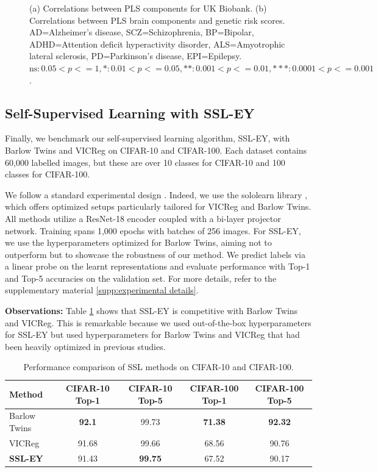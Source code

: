 \begin{figure}
\begin{subfigure}[b]{0.72\textwidth}
          \caption{}
          \label{fig:genetic_risk}
     \end{subfigure}
\caption{(a) Correlations between PLS components for UK Biobank. (b) Correlations between PLS brain components and genetic risk scores. AD=Alzheimer's disease, SCZ=Schizophrenia, BP=Bipolar, ADHD=Attention deficit hyperactivity disorder, ALS=Amyotrophic lateral sclerosis, PD=Parkinson's disease, EPI=Epilepsy. $\text{ns}: 0.05< p <= 1, \ast: 0.01< p <=0.05, \ast\ast: 0.001< p <= 0.01, \ast\ast\ast: 0.0001< p <= 0.001$.}
\end{figure}

\subsection{Self-Supervised Learning with SSL-EY}
Finally, we benchmark our self-supervised learning algorithm, SSL-EY, with Barlow Twins and VICReg on CIFAR-10 and CIFAR-100. Each dataset contains 60,000 labelled images, but these are over 10 classes for CIFAR-10 and 100 classes for CIFAR-100.

We follow a standard experimental design \citep{tong2023emp}. Indeed, we use the sololearn library \citep{da2022solo}, which offers optimized setups particularly tailored for VICReg and Barlow Twins. All methods utilize a ResNet-18 encoder coupled with a bi-layer projector network. Training spans 1,000 epochs with batches of 256 images. For SSL-EY, we use the hyperparameters optimized for Barlow Twins, aiming not to outperform but to showcase the robustness of our method.
We predict labels via a linear probe on the learnt representations and evaluate performance with Top-1 and Top-5 accuracies on the validation set. For more details, refer to the supplementary material \ref{supp:experimental details}.

\textbf{Observations:} Table \ref{tab:selfsup} shows that SSL-EY is competitive with Barlow Twins and VICReg. This is remarkable because we used out-of-the-box hyperparameters for SSL-EY but used hyperparameters for Barlow Twins and VICReg that had been heavily optimized in previous studies.

\begin{table}
    \centering
    \begin{tabular}{lcccc}
        \hline
        Method & CIFAR-10 Top-1 & CIFAR-10 Top-5 & CIFAR-100 Top-1 & CIFAR-100 Top-5 \\
        \hline
        Barlow Twins & \textbf{92.1} & 99.73 & \textbf{71.38} & \textbf{92.32} \\
        VICReg & 91.68 & 99.66 & 68.56 & 90.76 \\
        \textbf{SSL-EY} & 91.43 & \textbf{99.75} & 67.52 & 90.17 \\
        \hline
    \end{tabular}
    \caption{Performance comparison of SSL methods on CIFAR-10 and CIFAR-100.}
    \label{tab:selfsup}
\end{table}

